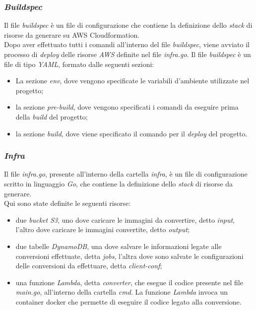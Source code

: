 \subsubsection{\emph{Buildspec}}

Il file \emph{buildspec} è un file di configurazione che contiene la definizione
dello \emph{stack} di risorse da generare su \glsfirstoccur\gls{AWS
    Cloudformation}. \\
Dopo aver effettuato tutti i comandi all'interno del file \emph{buildspec},
viene avviato il processo di \emph{deploy} delle risorse \emph{AWS} definite nel
file \emph{infra.go}. Il file \emph{buildspec} è un file di tipo \emph{YAML},
formato dalle seguenti sezioni:
\begin{itemize}
    \item La sezione \emph{env}, dove vengono specificate le variabili
          d'ambiente utilizzate nel progetto;
    \item la sezione \emph{pre-build}, dove vengono specificati i comandi da
          eseguire prima della \emph{build} del progetto;
    \item la sezione \emph{build}, dove viene specificato il comando per il
          \emph{deploy} del progetto.
\end{itemize}

\subsubsection{\emph{Infra}}

Il file \emph{infra.go}, presente all'interno della cartella \emph{infra}, è un file di configurazione scritto in linguaggio
\emph{Go}, che contiene la definizione dello \emph{stack} di risorse da
generare.\\
Qui sono state definite le seguenti risorse:
\begin{itemize}
    \item due \emph{bucket S3}, uno dove caricare le immagini da convertire,
          detto \emph{input}, l'altro dove caricare le immagini convertite, detto
          \emph{output};
    \item due tabelle \emph{DynamoDB}, una dove salvare le informazioni legate
          alle conversioni effettuate, detta \emph{jobs}, l'altra dove sono salvate le
          configurazioni delle conversioni da effettuare, detta \emph{client-conf};
    \item una funzione \emph{Lambda}, detta \emph{converter}, che esegue il
          codice presente nel file \emph{main.go}, all'interno della cartella
          \emph{cmd}. La funzione \emph{Lambda} invoca un \glsfirstoccur\gls{container}
          \glsfirstoccur\gls{docker} che permette di eseguire il codice legato
          alla conversione.
\end{itemize}

